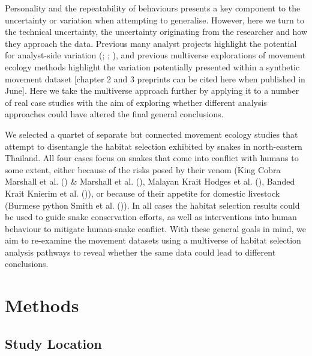 \documentclass[10pt,a4paper]{article}
\begin{document}
Personality and the repeatability of behaviours presents a key component to the uncertainty or variation when attempting to generalise.
However, here we turn to the technical uncertainty, the uncertainty originating from the researcher and how they approach the data.
Previous many analyst projects highlight the potential for analyst-side variation (; ; ), and previous multiverse explorations of movement ecology methods highlight the variation potentially presented within a synthetic movement dataset {[}chapter 2 and 3 preprints can be cited here when published in June{]}.
Here we take the multiverse approach further by applying it to a number of real case studies with the aim of exploring whether different analysis approaches could have altered the final general conclusions.

We selected a quartet of separate but connected movement ecology studies that attempt to disentangle the habitat selection exhibited by snakes in north-eastern Thailand.
All four cases focus on snakes that come into conflict with humans to some extent, either because of the risks posed by their venom (King Cobra Marshall et al. () \& Marshall et al. (), Malayan Krait Hodges et al. (), Banded Krait Knierim et al. ()), or because of their appetite for domestic livestock (Burmese python Smith et al. ()).
In all cases the habitat selection results could be used to guide snake conservation efforts, as well as interventions into human behaviour to mitigate human-snake conflict.
With these general goals in mind, we aim to re-examine the movement datasets using a multiverse of habitat selection analysis pathways to reveal whether the same data could lead to different conclusions.

\section{Methods}\label{methods}

\subsection{Study Location}\label{study-location}
\end{document}
